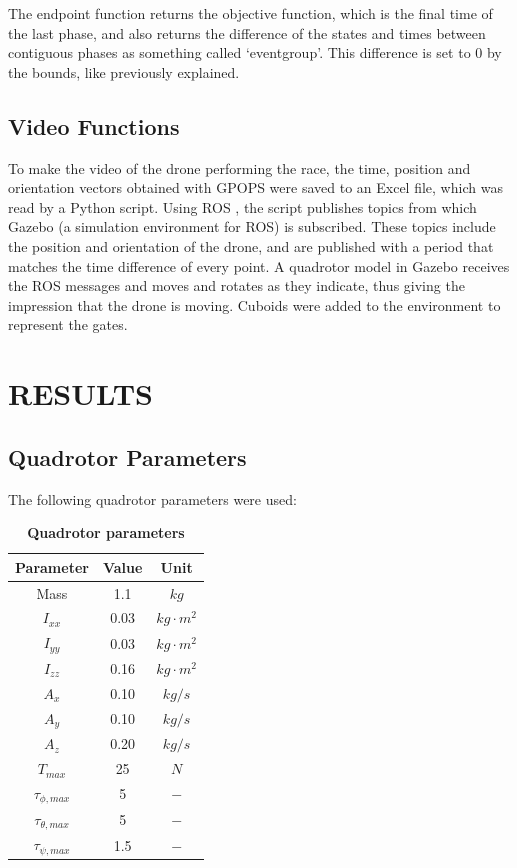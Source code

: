 \documentclass[letterpaper, 10 pt, conference]{ieeeconf}  %
\begin{document}
The endpoint function returns the objective function, which is the final time of the last phase, and also returns the difference of the states and times between contiguous phases as something called `eventgroup'. This difference is set to 0 by the bounds, like previously explained.

\subsection{Video Functions}

To make the video of the drone performing the race, the time, position and orientation vectors obtained with GPOPS were saved to an Excel file, which was read by a Python script. Using ROS \cite{quigley2009ros}, the script publishes topics from which Gazebo \cite{koenig2004design} (a simulation environment for ROS) is subscribed. These topics include the position and orientation of the drone, and are published with a period that matches the time difference of every point. A quadrotor model in Gazebo receives the ROS messages and moves and rotates as they indicate, thus giving the impression that the drone is moving. Cuboids were added to the environment to represent the gates.


\section{RESULTS}\label{s:res}

\subsection{Quadrotor Parameters}

The following quadrotor parameters were used:

\begin{table}[!htpb]
	\caption[Quadrotor parameters]{\bf Quadrotor parameters}
	\label{tbl:drone-params}
	\centering
	\def\arraystretch{1.3}
	\setlength{\tabcolsep}{3pt}
	\begin{tabular}{ccc}
		\textbf{Parameter} & \textbf{Value} & \textbf{Unit} \\ 
		\hline
		Mass & 1.1 & $kg$ \\
		$I_{xx}$  & 0.03 & $kg \cdot m^2$  \\
		$I_{yy}$  & 0.03 & $kg \cdot m^2$  \\
		$I_{zz}$  & 0.16 & $kg \cdot m^2$  \\
		$A_x$     & 0.10 & $kg / s$  \\
		$A_y$     & 0.10 & $kg / s$  \\
		$A_z$     & 0.20 & $kg / s$  \\
		$T_{max}$ & 25   & $N$  \\
		$\tau_{\phi, max}$   & 5    & $-$  \\  %
		$\tau_{\theta, max}$ & 5    & $-$  \\
		$\tau_{\psi, max}$   & 1.5  & $-$  \\		
	\end{tabular}
\end{table}
\end{document}
